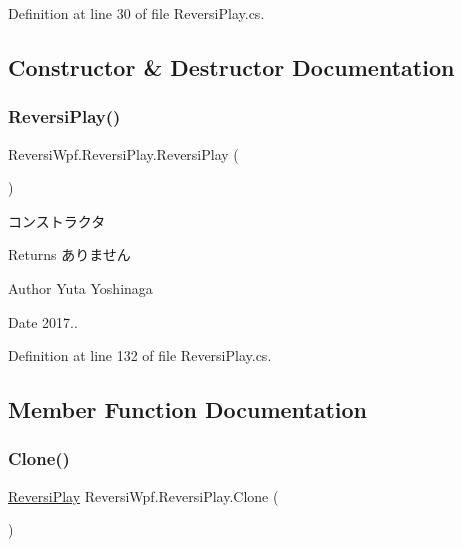 Definition at line 30 of file Reversi\+Play.\+cs.



\subsection{Constructor \& Destructor Documentation}
\mbox{\label{class_reversi_wpf_1_1_reversi_play_abcc100fea7e30e8f1e1b1ef4c574029b}} 
\subsubsection{\texorpdfstring{Reversi\+Play()}{ReversiPlay()}}
{\footnotesize\ttfamily Reversi\+Wpf.\+Reversi\+Play.\+Reversi\+Play (\begin{DoxyParamCaption}{ }\end{DoxyParamCaption})}



コンストラクタ 

\begin{DoxyReturn}{Returns}
ありません 
\end{DoxyReturn}
\begin{DoxyAuthor}{Author}
Yuta Yoshinaga 
\end{DoxyAuthor}
\begin{DoxyDate}{Date}
2017.. 
\end{DoxyDate}


Definition at line 132 of file Reversi\+Play.\+cs.



\subsection{Member Function Documentation}
\mbox{\label{class_reversi_wpf_1_1_reversi_play_a0b650938608eb497b7aceaef6a648980}} 
\subsubsection{\texorpdfstring{Clone()}{Clone()}}
{\footnotesize\ttfamily \hyperlink{class_reversi_wpf_1_1_reversi_play}{Reversi\+Play} Reversi\+Wpf.\+Reversi\+Play.\+Clone (\begin{DoxyParamCaption}{ }\end{DoxyParamCaption})}



